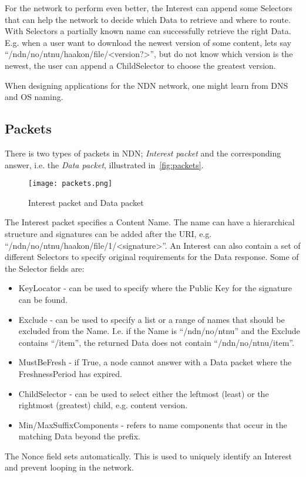 For the network to perform even better, the Interest can append some Selectors that can help the network to decide which Data to retrieve and where to route.
With Selectors a partially known name can successfully retrieve the right Data.
E.g. when a user want to download the newest version of some content, lets say ``/ndn/no/ntnu/haakon/file/<version?>'', but do not know which version is the newest, the user can append a ChildSelector to choose the greatest version.

When designing applications for the \gls{NDN} network, one might learn from \gls{DNS} and \gls{OS} naming.

\subsection{Packets}\label{packets}
There is two types of packets in \gls{NDN};
\textit{Interest packet} and the corresponding answer, i.e. the \textit{Data packet}, illustrated in~\autoref{fig:packets}.

\begin{figure}[H]
  \centering
  \texttt{[image: packets.png]}
  \caption{Interest packet and Data packet}
  \label{fig:packets}
\end{figure}

The Interest packet specifies a Content Name. 
The name can have a hierarchical structure and signatures can be added after the \gls{URI}, e.g. ``/ndn/no/ntnu/haakon/file/1/<signature>''.
An Interest can also contain a set of different Selectors to specify original requirements for the Data response. 
Some of the Selector fields are:
\begin{itemize}
  \item KeyLocator - can be used to specify where the Public Key for the signature can be found.
  \item Exclude - can be used to specify a list or a range of names that should be excluded from the Name. 
  I.e. if the Name is ``/ndn/no/ntnu'' and the Exclude contains ``/item'', the returned Data does not contain ``/ndn/no/ntnu/item''.
  \item MustBeFresh - if True, a node cannot answer with a Data packet where the FreshnessPeriod has expired.
  \item ChildSelector - can be used to select either the leftmost (least) or the rightmost (greatest) child, e.g. content version. 
  \item Min/MaxSuffixComponents - refers to name components that occur in the matching Data beyond the prefix. 
\end{itemize}
The Nonce field sets automatically. 
This is used to uniquely identify an Interest and prevent looping in the network.

